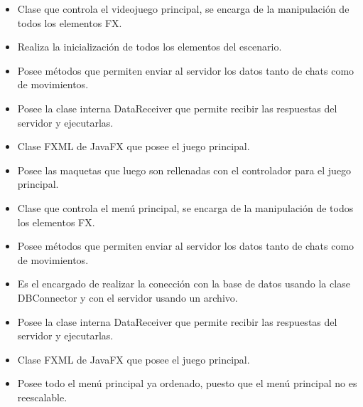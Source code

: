 \documentclass{article}
\begin{document}

\begin{itemize}
	\item Clase que controla el videojuego principal, se encarga de la manipulación de todos los elementos FX.
	\item Realiza la inicialización de todos los elementos del escenario.
	\item Posee métodos que permiten enviar al servidor los datos tanto de chats como de movimientos.
	\item Posee la clase interna DataReceiver que permite recibir las respuestas del servidor y ejecutarlas.
\end{itemize}

\begin{itemize}
	\item Clase FXML de JavaFX que posee el juego principal.
	\item Posee las maquetas que luego son rellenadas con el controlador para el juego principal.
\end{itemize}

\begin{itemize}
	\item Clase que controla el menú principal, se encarga de la manipulación de todos los elementos FX.
	\item Posee métodos que permiten enviar al servidor los datos tanto de chats como de movimientos.
	\item Es el encargado de realizar la conección con la base de datos usando la clase DBConnector y con el servidor usando un archivo.
	\item Posee la clase interna DataReceiver que permite recibir las respuestas del servidor y ejecutarlas.
\end{itemize}

\begin{itemize}
	\item Clase FXML de JavaFX que posee el juego principal.
	\item Posee todo el menú principal ya ordenado, puesto que el menú principal no es reescalable.
\end{itemize}

\end{document}
